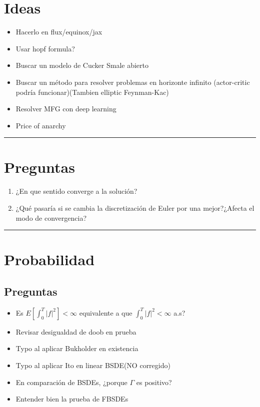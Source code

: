 \documentclass{article}
\newcommand{\HRule}{\rule{\linewidth}{0.5mm}}
\begin{document}
    \section*{Ideas}
    \begin{itemize}
    	\item Hacerlo en flux/equinox/jax
    	\item Usar hopf formula? 
    	\item Buscar un modelo de Cucker Smale abierto
    	\item Buscar un método para resolver problemas en horizonte infinito (actor-critic podría funcionar)(Tambien elliptic Feynman-Kac)
    	\item Resolver MFG con deep learning
    	\item Price of anarchy
    \end{itemize}
    \HRule\par
    \section*{Preguntas}
	\begin{enumerate}
	\item ¿En que sentido converge a la solución?
	\item ¿Qué pasaría si se cambia la discretización de Euler por una mejor?¿Afecta el modo de convergencia?
	\end{enumerate}
    \HRule\par
    \section*{Probabilidad}
    \subsection*{Preguntas}
    \begin{itemize}
    	\item Es $E[\int_{0}^{T} |f|^2]<\infty$ equivalente a que $\int_{0}^{T}|f|^2<\infty$ a.s?
    	\item Revisar desigualdad de doob en prueba
    	\item Typo al aplicar Bukholder en existencia
    	\item Typo al aplicar Ito en linear BSDE(NO corregido)
    	\item En comparación de BSDEs, ¿porque $\Gamma$ es positivo?
    	\item Entender bien la prueba de FBSDEs
    \end{itemize}
\end{document}
